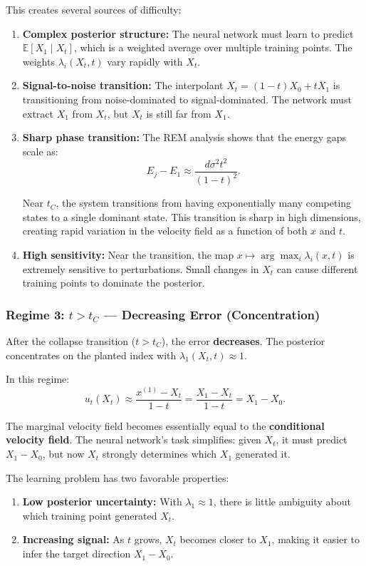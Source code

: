 \documentclass[11pt]{article}
\begin{document}
This creates several sources of difficulty:
\begin{enumerate}
\item \textbf{Complex posterior structure:} The neural network must learn to predict $\mathbb{E}[X_1 \mid X_t]$, which is a weighted average over multiple training points. The weights $\lambda_i(X_t, t)$ vary rapidly with $X_t$.
\item \textbf{Signal-to-noise transition:} The interpolant $X_t = (1-t)X_0 + tX_1$ is transitioning from noise-dominated to signal-dominated. The network must extract $X_1$ from $X_t$, but $X_t$ is still far from $X_1$.
\item \textbf{Sharp phase transition:} The REM analysis shows that the energy gaps scale as:
\begin{equation}
E_j - E_1 \approx \frac{d \sigma^2 t^2}{(1-t)^2}.
\end{equation}

Near $t_C$, the system transitions from having exponentially many competing states to a single dominant state. This transition is sharp in high dimensions, creating rapid variation in the velocity field as a function of both $x$ and $t$.
\item \textbf{High sensitivity:} Near the transition, the map $x \mapsto \arg\max_i \lambda_i(x,t)$ is extremely sensitive to perturbations. Small changes in $X_t$ can cause different training points to dominate the posterior.
\end{enumerate}

\subsubsection{Regime 3: $t > t_C$ --- Decreasing Error (Concentration)}
After the collapse transition ($t > t_C$), the error \textbf{decreases}. The posterior concentrates on the planted index with $\lambda_1(X_t, t) \approx 1$.

In this regime:
\begin{equation}
u_t(X_t) \approx \frac{x^{(1)} - X_t}{1-t} = \frac{X_1 - X_t}{1-t} = X_1 - X_0.
\end{equation}

The marginal velocity field becomes essentially equal to the \textbf{conditional velocity field}. The neural network's task simplifies: given $X_t$, it must predict $X_1 - X_0$, but now $X_t$ strongly determines which $X_1$ generated it.

The learning problem has two favorable properties:
\begin{enumerate}
\item \textbf{Low posterior uncertainty:} With $\lambda_1 \approx 1$, there is little ambiguity about which training point generated $X_t$.
\item \textbf{Increasing signal:} As $t$ grows, $X_t$ becomes closer to $X_1$, making it easier to infer the target direction $X_1 - X_0$.
\end{enumerate}
\end{document}
